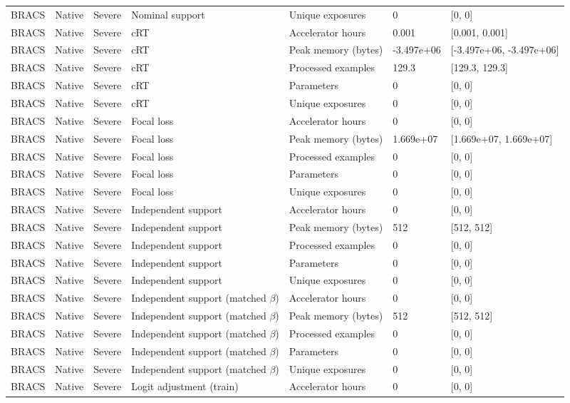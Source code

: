 \begin{longtable}{lllllll}
BRACS & Native & Severe & Nominal support & Unique exposures & 0 & [0, 0] \\
BRACS & Native & Severe & cRT & Accelerator hours & 0.001 & [0.001, 0.001] \\
BRACS & Native & Severe & cRT & Peak memory (bytes) & -3.497e+06 & [-3.497e+06, -3.497e+06] \\
BRACS & Native & Severe & cRT & Processed examples & 129.3 & [129.3, 129.3] \\
BRACS & Native & Severe & cRT & Parameters & 0 & [0, 0] \\
BRACS & Native & Severe & cRT & Unique exposures & 0 & [0, 0] \\
BRACS & Native & Severe & Focal loss & Accelerator hours & 0 & [0, 0] \\
BRACS & Native & Severe & Focal loss & Peak memory (bytes) & 1.669e+07 & [1.669e+07, 1.669e+07] \\
BRACS & Native & Severe & Focal loss & Processed examples & 0 & [0, 0] \\
BRACS & Native & Severe & Focal loss & Parameters & 0 & [0, 0] \\
BRACS & Native & Severe & Focal loss & Unique exposures & 0 & [0, 0] \\
BRACS & Native & Severe & Independent support & Accelerator hours & 0 & [0, 0] \\
BRACS & Native & Severe & Independent support & Peak memory (bytes) & 512 & [512, 512] \\
BRACS & Native & Severe & Independent support & Processed examples & 0 & [0, 0] \\
BRACS & Native & Severe & Independent support & Parameters & 0 & [0, 0] \\
BRACS & Native & Severe & Independent support & Unique exposures & 0 & [0, 0] \\
BRACS & Native & Severe & Independent support (matched $\beta$) & Accelerator hours & 0 & [0, 0] \\
BRACS & Native & Severe & Independent support (matched $\beta$) & Peak memory (bytes) & 512 & [512, 512] \\
BRACS & Native & Severe & Independent support (matched $\beta$) & Processed examples & 0 & [0, 0] \\
BRACS & Native & Severe & Independent support (matched $\beta$) & Parameters & 0 & [0, 0] \\
BRACS & Native & Severe & Independent support (matched $\beta$) & Unique exposures & 0 & [0, 0] \\
BRACS & Native & Severe & Logit adjustment (train) & Accelerator hours & 0 & [0, 0] \\

\end{longtable}
